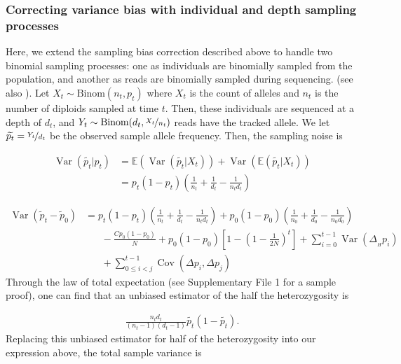 \documentclass[11pt]{article}
\newcommand{\E}{\mathbb{E}}
\DeclareMathOperator{\var}{Var}
\DeclareMathOperator{\cov}{Cov}
\begin{document}
\subsubsection{Correcting variance bias with individual and depth sampling processes}
\label{supp:ind-depth-var-corr}

Here, we extend the sampling bias correction described above to handle two
binomial sampling processes: one as individuals are binomially sampled from the
population, and another as reads are binomially sampled during sequencing.
(see also \cite{Jonas2016-ia}). Let $X_t \sim \text{Binom}(n_t, p_t)$ where
$X_t$ is the count of alleles and $n_t$ is the number of diploids sampled at
time $t$. Then, these individuals are sequenced at a depth of $d_t$, and $Y_t
\sim \text{Binom}(d_t, \nicefrac{X_t}{n_t})$ reads have the tracked allele. We
let $\widetilde{p_t} = \nicefrac{Y_t}{d_t}$ be the observed sample allele
frequency. Then, the sampling noise is 

\begin{align}
  \var(\widetilde{p_t}|p_t) &= \E(\var(\widetilde{p_t} | X_t)) + \var(\E(\widetilde{p_t} | X_t)) \\
                            &= p_t(1-p_t) \left(\frac{1}{n_t} + \frac{1}{d_t} - \frac{1}{n_t d_t} \right)
\end{align}


\begin{align}
  \var(\widetilde{p}_t - \widetilde{p}_0) &= 
  p_t(1-p_t) \left(\frac{1}{n_t} + \frac{1}{d_t} - \frac{1}{n_t d_t} \right)  
  + p_0(1-p_0) \left( \frac{1}{n_0} + \frac{1}{d_0} - \frac{1}{n_0 d_0}\right)  \\ & \;\;\;\;\;\;
  - \frac{C p_0(1-p_0)}{N} + p_0(1-p_0) \left[1 - \left(1-\frac{1}{2N}\right)^t \right]+ \sum_{i=0}^{t-1} \var(\Delta_{_H} p_i)  \\ & \;\;\;\;\;\; + \sum_{0 \le i < j}^{t-1} \cov(\Delta p_i, \Delta p_j) 
\end{align}
%
Through the law of total expectation (see \cite{Kolaczkowski2011-ee}
Supplementary File 1 for a sample proof), one can find that an unbiased
estimator of the half the heterozygosity is 

\begin{align}
  \frac{n_t d_t}{(n_t-1) (d_t-1)} \widetilde{p_t}(1-\widetilde{p_t}).
\end{align}
%
Replacing this unbiased estimator for half of the heterozygosity into our
expression above, the total sample variance is
\end{document}
